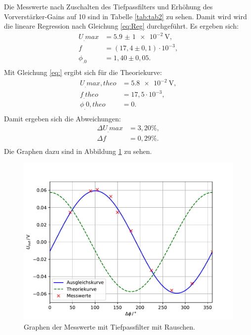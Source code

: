 \noindent Die Messwerte nach Zuschalten des Tiefpassfilters und Erhöhung des Vorverstärker-Gains auf 10 sind in Tabelle \ref{tab:tab2} zu sehen. Damit wird wird die lineare Regression nach Gleichung \eqref{eq:Reg} durchgeführt.
Es ergeben sich:
\begin{align*}
U_.{max} &= \SI{5,9(1)e-2}{\volt} ,\\
f 		 &= (17,4\pm0,1)\cdot 10^{-3} ,\\
\phi_.0  &= 1,40\pm0,05 \text{.}\\
\end{align*}
Mit Gleichung \eqref{eq:} ergibt sich für die Theoriekurve:
\begin{align*}
U_.{max,theo} &= \SI{5,8e-2}{\volt} ,\\
f_.{theo}	  &= 17,5\cdot 10^{-3} ,\\
\phi_.{0,theo}&= 0 \text{.}\\
\end{align*}
Damit ergeben sich die Abweichungen:
\begin{align*}
\Delta U_.{max} &= 3,20\% ,\\
\Delta f		&= 0,29\% \text{.}\\
\end{align*}
Die Graphen dazu sind in Abbildung \ref{fig:U4} zu sehen.

\begin{figure}
\centering
\includegraphics[width=\linewidth-75pt,height=\textheight-75pt,keepaspectratio]{content/images/plot2.pdf}
\caption{Graphen der Messwerte mit Tiefpassfilter mit Rauschen.}\label{fig:U4}
\end{figure}


